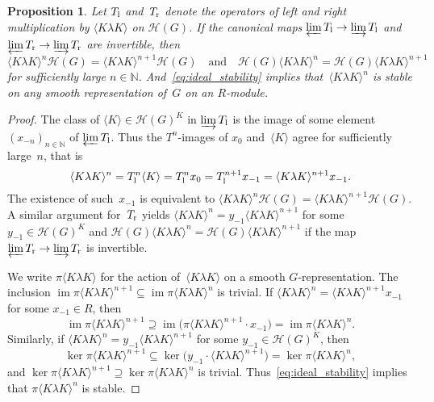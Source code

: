 \documentclass{amsart}
\newtheorem{proposition}[theorem]{Proposition}
\theoremstyle{remark}
\theoremstyle{definition}
\DeclareMathOperator{\im}{im}%
\newcommand*{\nb}{\nobreakdash}%
\newcommand*{\idem}[1]{\langle#1\rangle}%
\newcommand*{\N}{\mathbb N}%
\newcommand*{\lefts}{\textup l}%
\newcommand*{\rights}{\textup r}%
\newcommand*{\Op}{T}%
\newcommand{\ring}{R}%
\newcommand*{\Hecke}{\mathcal H}%
\begin{document}
\begin{proposition}
  \label{pro:Jacquet_Stability_as_limit_converse}
  Let \(\Op_\lefts\) and~\(\Op_\rights\) denote the operators of left and right multiplication by \(\idem{K\lambda K}\) on \(\Hecke(G)\).  If the canonical maps \(\varprojlim \Op_\lefts \to \varinjlim \Op_\lefts\) and \(\varprojlim \Op_\rights \to \varinjlim \Op_\rights\) are invertible, then
  \begin{equation}
    \label{eq:ideal_stability}
    \idem{K\lambda K}^n\Hecke(G) = \idem{K\lambda K}^{n+1}\Hecke(G)
    \quad\text{and}\quad
    \Hecke(G)\idem{K\lambda K}^n = \Hecke(G)\idem{K\lambda K}^{n+1}
  \end{equation}
  for sufficiently large \(n\in\N\).  And~\eqref{eq:ideal_stability} implies that~\(\idem{K\lambda K}^n\) is stable on any smooth representation of~\(G\) on an \(\ring\)\nb-module.
\end{proposition}

\begin{proof}
  The class of \(\idem{K}\in \Hecke(G)^K\) in \(\varinjlim \Op_\lefts\) is the image of some element~\((x_{-n})_{n\in\N}\) of \(\varprojlim \Op_\lefts\).  Thus the \(\Op^n\)\nb-images of \(x_0\) and~\(\idem{K}\) agree for sufficiently large~\(n\), that is
  \[
  \idem{K\lambda K}^n = \Op_\lefts^n\idem{K} = \Op_\lefts^n x_0 = \Op_\lefts^{n+1}x_{-1}
  = \idem{K\lambda K}^{n+1} x_{-1}.
  \]
  The existence of such~\(x_{-1}\) is equivalent to \(\idem{K\lambda K}^n\Hecke(G) =\idem{K\lambda K}^{n+1}\Hecke(G)\).  A similar argument for~\(\Op_\rights\) yields \(\idem{K\lambda K}^n = y_{-1} \idem{K\lambda K}^{n+1}\) for some \(y_{-1}\in \Hecke(G)^K\) and \(\Hecke(G)\idem{K\lambda K}^n = \Hecke(G)\idem{K\lambda K}^{n+1}\) if the map \(\varprojlim \Op_\rights \to \varinjlim \Op_\rights\) is invertible.

  We write \(\pi\idem{K\lambda K}\) for the action of~\(\idem{K\lambda K}\) on a smooth \(G\)\nb-representation.  The inclusion \(\im \pi \idem{K \lambda K}^{n+1} \subseteq \im \pi\idem{K \lambda K}^n\) is trivial.  If \(\idem{K\lambda K}^n = \idem{K\lambda K}^{n+1} x_{-1}\) for some \(x_{-1}\in \ring\), then
  \[
  \im \pi\idem{K \lambda K}^{n+1}
  \supseteq \im\bigl( \pi\idem{K \lambda K}^{n+1}\cdot x_{-1} \bigr)
  = \im \pi\idem{K \lambda K}^n.
  \]
  Similarly, if \(\idem{K\lambda K}^n = y_{-1} \idem{K\lambda K}^{n+1}\) for some \(y_{-1}\in \Hecke(G)^K\), then
  \[
  \ker \pi\idem{K \lambda K}^{n+1}
  \subseteq \ker \bigl(y_{-1}\cdot \idem{K \lambda K}^{n+1}\bigr)
  = \ker \pi\idem{K \lambda K}^n,
  \]
  and \(\ker \pi\idem{K \lambda K}^{n+1} \supseteq \ker \pi\idem{K \lambda K}^n\) is trivial.  Thus~\eqref{eq:ideal_stability} implies that \(\pi\idem{K \lambda K}^n\) is stable.
\end{proof}
\end{document}
